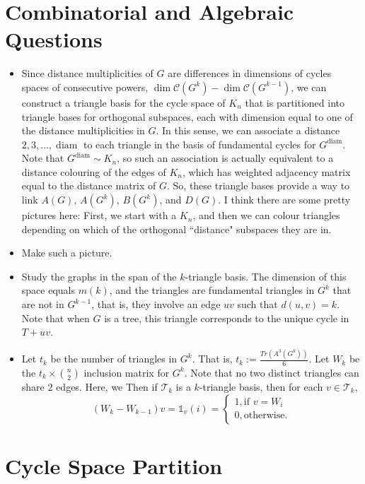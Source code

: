 \documentclass[12pt]{article}
\DeclareMathOperator{\diam}{diam}
\theoremstyle{definition}
\begin{document}
\section{Combinatorial and Algebraic Questions}
\begin{itemize}
	\item Since distance multiplicities of $G$ are differences in dimensions of cycles spaces of consecutive powers, $\dim\mathcal{C}(G^k) - \dim\mathcal{C}(G^{k-1})$, we can construct a triangle basis for the cycle space of $K_n$ that is partitioned into triangle bases for orthogonal subspaces, each with dimension equal to one of the distance multiplicities in $G$.  In this sense, we can associate a distance $2, 3, \ldots, \diam$ to each triangle in the basis of fundamental cycles for $G^{\diam}$.  Note that $G^{\diam} \sim K_n$, so such an association is actually equivalent to a distance colouring of the edges of $K_n$, which has weighted adjacency matrix equal to the distance matrix of $G$.  So, these triangle bases provide a way to link $A(G)$, $A(G^k)$, $B(G^k)$, and $D(G)$.  I think there are some pretty pictures here: First, we start with a $K_n$, and then we can colour triangles depending on which of the orthogonal ``distance" subspaces they are in.
	\item Make such a picture.
	\item Study the graphs in the span of the $k$-triangle basis.  The dimension of this space equals $m(k)$, and the triangles are fundamental triangles in $G^k$ that are not in $G^{k-1}$, that is, they involve an edge $uv$ such that $d(u,v) = k$.  Note that when $G$ is a tree, this triangle corresponds to the unique cycle in $T+uv$.
	\item Let $t_k$ be the number of triangles in $G^k$.  That is, $t_k := \tfrac{Tr(A^3(G^k))}{6}$.  Let $W_k$ be the $t_k \times {n \choose 2}$ inclusion matrix for $G^k$.  Note that no two distinct triangles can share $2$ edges.  Here, we Then if $\mathcal{T}_k$ is a $k$-triangle basis, then for each $v \in \mathcal{T}_k$, 
	$$(W_k - W_{k-1})v = \mathbb{1}_v(i) = \begin{cases}
		1, \text{if } v = W_i	\\
		0, \text{otherwise.}
	\end{cases}$$
\end{itemize}
\fi

\newpage

\section{Cycle Space Partition}
\end{document}
